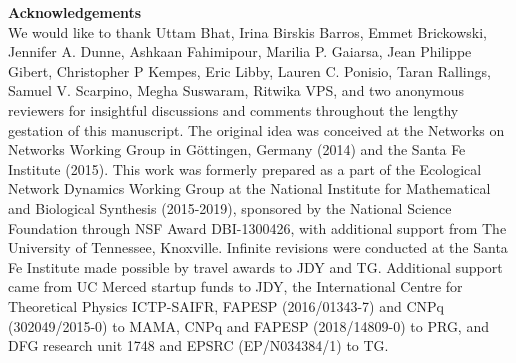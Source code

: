 \documentclass[twocolumn,preprintnumbers,amsmath,amssymb,superscriptaddress,linenumbers]{revtex4-1}
\begin{document}
% 
% 
% 
% 





\vspace{2mm}
\noindent \textbf{Acknowledgements}\\
  \footnotesize{
  We would like to thank
  Uttam Bhat,
  Irina Birskis Barros,
  Emmet Brickowski,
  Jennifer A. Dunne,
  Ashkaan Fahimipour,
  Marilia P. Gaiarsa,
  Jean Philippe Gibert,
  Christopher P Kempes,
  Eric Libby,
  Lauren C. Ponisio,
  Taran Rallings,
  Samuel V. Scarpino,
  Megha Suswaram,
  Ritwika VPS,
  and two anonymous reviewers
  for insightful discussions and comments throughout the lengthy gestation of this manuscript.
  The original idea was conceived at the Networks on Networks Working Group in G\"ottingen, Germany (2014) and the Santa Fe Institute (2015).
  This work was formerly prepared as a part of the Ecological Network Dynamics Working Group at the National Institute for Mathematical and Biological Synthesis (2015-2019), sponsored by the National Science Foundation through NSF Award DBI-1300426, with additional support from The University of Tennessee, Knoxville.
  Infinite revisions were conducted at the Santa Fe Institute made possible by travel awards to JDY and TG.
  Additional support came from UC Merced startup funds to JDY, the International Centre for Theoretical Physics ICTP-SAIFR, FAPESP (2016/01343-7) and CNPq (302049/2015-0) to MAMA, CNPq and FAPESP (2018/14809-0) to PRG, and DFG research unit 1748 and EPSRC (EP/N034384/1) to TG.
  }\\ \\
  
\end{document}

